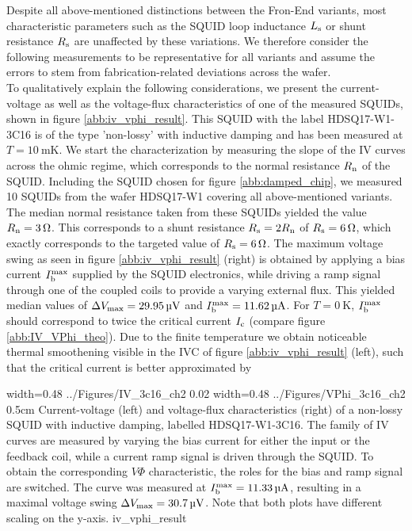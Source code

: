 Despite all above-mentioned distinctions between the Fron-End variants, most characteristic parameters such as the SQUID loop inductance $L_{\rm s}$ or shunt resistance $R_{\rm s}$ are unaffected by these variations. We therefore consider the following measurements to be representative for all variants and assume the errors to stem from fabrication-related deviations across the wafer. \\
To qualitatively explain the following considerations, we present the current-voltage as well as the voltage-flux characteristics of one of the measured SQUIDs, shown in figure \ref{abb:iv_vphi_result}. This SQUID with the label HDSQ17-W1-3C16 is of the type 'non-lossy' with inductive damping and has been measured at $T=\qty{10}{\milli\kelvin}$. We start the characterization by measuring the slope of the IV curves across the ohmic regime, which corresponds to the normal resistance $R_{\rm n}$ of the SQUID. Including the SQUID chosen for figure \ref{abb:damped_chip}, we measured 10 SQUIDs from the wafer HDSQ17-W1 covering all above-mentioned variants. The median normal resistance taken from these SQUIDs yielded the value $R_{\rm n}=\qty{3}{\ohm}$. This corresponds to a shunt resistance $R_{\rm s}=2R_{\rm n}$ of $R_{\rm s}=\qty{6}{\ohm}$, which exactly corresponds to the targeted value of $R_{\rm s}=\qty{6}{\ohm}$. The maximum voltage swing as seen in figure \ref{abb:iv_vphi_result} (right) is obtained by applying a bias current $I_{\rm b}^{\rm max}$ supplied by the SQUID electronics, while driving a ramp signal through one of the coupled coils to provide a varying external flux. This yielded median values of $\Delta V_{\rm max}=\qty{29.95}{\micro\volt}$ and $I_{\rm b}^{\rm max}=\qty{11.62}{\micro\ampere}$. For $T=\qty{0}{\kelvin}$, $I_{\rm b}^{\rm max}$ should correspond to twice the critical current $I_{\rm c}$ (compare figure \ref{abb:IV_VPhi_theo}). Due to the finite temperature we obtain noticeable thermal smoothening visible in the IVC of figure \ref{abb:iv_vphi_result} (left), such that the critical current is better approximated by \cite{Drung1996}

{width=0.48\textwidth}
{../Figures/IV_3c16_ch2}
{0.02\textwidth} %
{width=0.48\textwidth}
{../Figures/VPhi_3c16_ch2}
{0.5cm} %
{Current-voltage (left) and voltage-flux characteristics (right) of a non-lossy SQUID with inductive damping, labelled HDSQ17-W1-3C16. The family of IV curves are measured by varying the bias current for either the input or the feedback coil, while a current ramp signal is driven through the SQUID. To obtain the corresponding $V\Phi$ characteristic, the roles for the bias and ramp signal are switched. The curve was measured at $I_{\rm b}^{\rm max}=\qty{11.33}{\uA}$, resulting in a maximal voltage swing $\Delta V_{\rm max}=\qty{30.7}{\uV}$. Note that both plots have different scaling on the y-axis.}
{iv_vphi_result}



